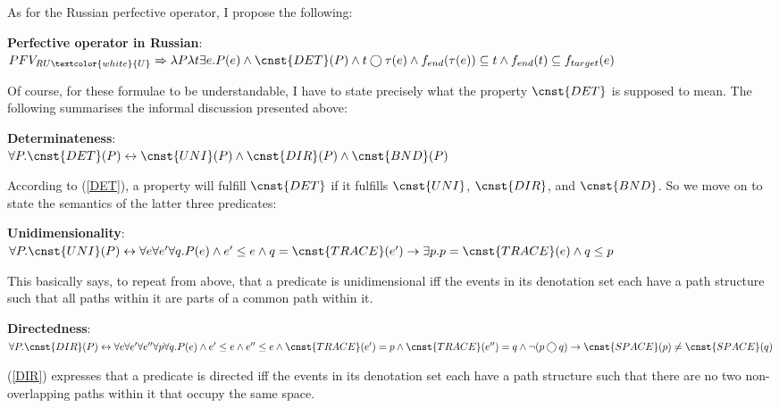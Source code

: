 \documentclass[output=paper,colorlinks,citecolor=brown]{langscibook}
\begin{document}
\noindent As for the Russian perfective operator, I propose the following:  

\ea\label{pfrussian}
\textbf{Perfective operator in Russian}:\\
$PFV_{RU\textcolor{white}{U}} \Rightarrow  \lambda P \lambda t \exists e . P(e) \wedge \cnst{DET}(P) \wedge t \bigcirc \tau(e) \wedge f_{end}(\tau(e)) \subseteq t \wedge f_{end}(t) \subseteq f_{target}(e) $
\z

\noindent Of course, for these formulae to be understandable, I have to state precisely what the property $\cnst{DET}$ is supposed to mean. The following summarises the informal discussion presented above: 

\ea\label{DET}
\textbf{Determinateness}:\\
$\forall P. \cnst{DET}(P) \leftrightarrow \cnst{UNI}(P) \wedge \cnst{DIR}(P) \wedge \cnst{BND}(P)$
\z

\noindent According to (\ref{DET}), a property will fulfill $\cnst{DET}$ if it fulfills $\cnst{UNI}$, $\cnst{DIR}$, and $\cnst{BND}$. So we move on to state the semantics of the latter three predicates:


\ea\label{UNI}
\textbf{Unidimensionality}:\\
$\forall P. \cnst{UNI}(P) \leftrightarrow \forall e \forall e' \forall q . P(e) \wedge e' \leq e \wedge q = \cnst{TRACE}(e') \rightarrow \exists p . p = \cnst{TRACE}(e) \wedge q \leq p$
\z

\noindent This basically says, to repeat from above, that 
a predicate is unidimensional iff the events in its denotation set each have a path structure such that all paths within it are parts of a common path within it. 

\ea\label{DIR}
\textbf{Directedness}:\\
$\forall P. \cnst{DIR}(P) \leftrightarrow \forall e \forall e' \forall e'' \forall p \forall q . P(e) \wedge e' \leq e \wedge e'' \leq e \wedge \cnst{TRACE}(e') = p \wedge \cnst{TRACE}(e'') = q \wedge \neg (p \bigcirc q) \rightarrow \cnst{SPACE}(p) \neq \cnst{SPACE}(q)  $
\z

\noindent (\ref{DIR}) expresses that a predicate is directed iff the events in its denotation set each have a path structure such that there are no two non-overlapping paths within it that occupy the same space. 
\end{document}
